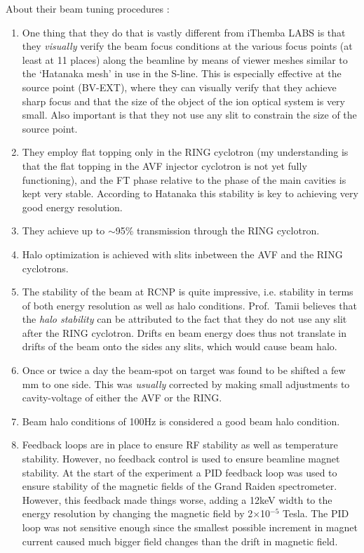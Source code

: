 \documentclass[11pt]{report}
\begin{document}
\noindent About their beam tuning procedures \cite{Nev08}:
\begin{enumerate}
\item One thing that they do that is vastly different from iThemba LABS is that they {\it visually} 
verify the beam focus conditions at the various focus points (at least at 11 places)
along the beamline by means of viewer meshes similar to the `Hatanaka mesh' in use in the S-line.
This is especially effective at the source point (BV-EXT), 
where they can visually verify that they achieve sharp focus and
that the size of the object of the ion optical system 
is very small. Also important is that they 
not use any slit to constrain the size of the source point.
\item They employ flat topping only in the RING cyclotron (my understanding is that the flat topping
in the AVF injector cyclotron is not yet fully functioning), and the FT phase relative to the phase of the main
cavities is kept very stable. According to Hatanaka this stability is key to achieving very good energy
resolution.
\item They achieve up to $\sim$95\% transmission through the RING cyclotron.
\item Halo optimization is achieved with slits inbetween the AVF and the RING cyclotrons.

\item The stability of the beam at RCNP is quite impressive, i.e. stability in terms of both energy resolution 
as well as halo conditions. Prof.~Tamii believes that the {\it halo stability} can be attributed
to the fact that they do not use any slit after the RING cyclotron. Drifts en beam energy does thus
not translate in drifts of the beam onto the sides any slits, which would cause beam halo. 
\item Once or twice a day the beam-spot on target was found to be shifted a few 
mm to one side. This was {\it usually} corrected by making small adjustments to 
cavity-voltage of either the AVF or the RING.

\item Beam halo conditions of 100Hz is considered a good beam halo condition.
\item Feedback loops are in place to ensure RF stability as well as temperature stability. However, 
no feedback control
is used to ensure beamline magnet stability. At the start of the experiment
a PID feedback loop was used to ensure stability of the magnetic fields of the Grand Raiden spectrometer.
However, this feedback made things worse, adding a 12keV width to the energy resolution by changing
the magnetic field by 2$\times$10$^{-5}$ Tesla.
The PID loop was not sensitive enough since the smallest possible increment in magnet current 
caused much bigger field changes than the drift in magnetic field.

\end{enumerate}
\end{document}

